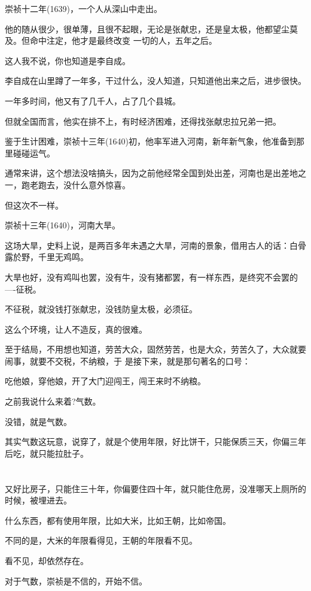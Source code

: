 \documentclass[11pt,a4paper,onecolumn]{article}
\begin{document}
崇祯十二年(1639)，一个人从深山中走出。

他的随从很少，很单薄，且很不起眼，无论是张献忠，还是皇太极，他都望尘莫及。但命中注定，他才是最终改变
一切的人，五年之后。

这人我不说，你也知道是李自成。

李自成在山里蹲了一年多，干过什么，没人知道，只知道他出来之后，进步很快。

一年多时间，他又有了几千人，占了几个县城。

但就全国而言，他实在排不上，有时经济困难，还得找张献忠拉兄弟一把。

鉴于生计困难，崇祯十三年(1640)初，他率军进入河南，新年新气象，他准备到那里碰碰运气。

通常来讲，这个想法没啥搞头，因为之前他经常全国到处出差，河南也是出差地之一，跑老跑去，没什么意外惊喜。

但这次不一样。

崇祯十三年(1640)，河南大旱。

这场大旱，史料上说，是两百多年未遇之大旱，河南的景象，借用古人的话：白骨露於野，千里无鸡鸣。

大旱也好，没有鸡叫也罢，没有牛，没有猪都罢，有一样东西，是终究不会罢的----征税。

不征税，就没钱打张献忠，没钱防皇太极，必须征。

这么个环境，让人不造反，真的很难。

至于结局，不用想也知道，劳苦大众，固然劳苦，也是大众，劳苦久了，大众就要闹事，就要不交税，不纳粮，于
是接下来，就是那句著名的口号：

吃他娘，穿他娘，开了大门迎闯王，闯王来时不纳粮。

之前我说什么来着?气数。

没错，就是气数。

其实气数这玩意，说穿了，就是个使用年限，好比饼干，只能保质三天，你偏三年后吃，就只能拉肚子。

\section[\thesection]{}

又好比房子，只能住三十年，你偏要住四十年，就只能住危房，没准哪天上厕所的时候，被埋进去。

什么东西，都有使用年限，比如大米，比如王朝，比如帝国。

不同的是，大米的年限看得见，王朝的年限看不见。

看不见，却依然存在。

对于气数，崇祯是不信的，开始不信。
\end{document}
